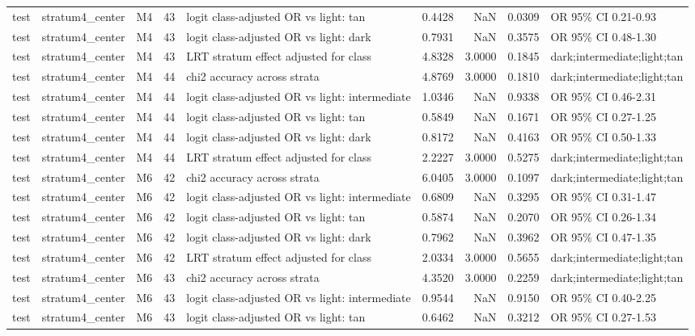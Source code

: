 \begin{tabular}{lllrlrrrl}
test & stratum4\_center & M4 & 43 & logit class-adjusted OR vs light: tan & 0.4428 & NaN & 0.0309 & OR 95\% CI 0.21-0.93 \\
test & stratum4\_center & M4 & 43 & logit class-adjusted OR vs light: dark & 0.7931 & NaN & 0.3575 & OR 95\% CI 0.48-1.30 \\
test & stratum4\_center & M4 & 43 & LRT stratum effect adjusted for class & 4.8328 & 3.0000 & 0.1845 & dark;intermediate;light;tan \\
test & stratum4\_center & M4 & 44 & chi2 accuracy across strata & 4.8769 & 3.0000 & 0.1810 & dark;intermediate;light;tan \\
test & stratum4\_center & M4 & 44 & logit class-adjusted OR vs light: intermediate & 1.0346 & NaN & 0.9338 & OR 95\% CI 0.46-2.31 \\
test & stratum4\_center & M4 & 44 & logit class-adjusted OR vs light: tan & 0.5849 & NaN & 0.1671 & OR 95\% CI 0.27-1.25 \\
test & stratum4\_center & M4 & 44 & logit class-adjusted OR vs light: dark & 0.8172 & NaN & 0.4163 & OR 95\% CI 0.50-1.33 \\
test & stratum4\_center & M4 & 44 & LRT stratum effect adjusted for class & 2.2227 & 3.0000 & 0.5275 & dark;intermediate;light;tan \\
test & stratum4\_center & M6 & 42 & chi2 accuracy across strata & 6.0405 & 3.0000 & 0.1097 & dark;intermediate;light;tan \\
test & stratum4\_center & M6 & 42 & logit class-adjusted OR vs light: intermediate & 0.6809 & NaN & 0.3295 & OR 95\% CI 0.31-1.47 \\
test & stratum4\_center & M6 & 42 & logit class-adjusted OR vs light: tan & 0.5874 & NaN & 0.2070 & OR 95\% CI 0.26-1.34 \\
test & stratum4\_center & M6 & 42 & logit class-adjusted OR vs light: dark & 0.7962 & NaN & 0.3962 & OR 95\% CI 0.47-1.35 \\
test & stratum4\_center & M6 & 42 & LRT stratum effect adjusted for class & 2.0334 & 3.0000 & 0.5655 & dark;intermediate;light;tan \\
test & stratum4\_center & M6 & 43 & chi2 accuracy across strata & 4.3520 & 3.0000 & 0.2259 & dark;intermediate;light;tan \\
test & stratum4\_center & M6 & 43 & logit class-adjusted OR vs light: intermediate & 0.9544 & NaN & 0.9150 & OR 95\% CI 0.40-2.25 \\
test & stratum4\_center & M6 & 43 & logit class-adjusted OR vs light: tan & 0.6462 & NaN & 0.3212 & OR 95\% CI 0.27-1.53 \\

\end{tabular}
